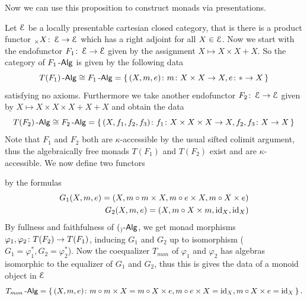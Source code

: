 \documentclass[a4paper,11pt,oneside,openany]{scrbook}
\begin{document}
Now we can use this proposition to construct monads via presentations.

\begin{exmp}
	Let $\operatorname{\mathcal{E}}$ be a locally presentable cartesian closed category, that is there is a product functor $_ \times X \colon \operatorname{\mathcal{E}} \to \operatorname{\mathcal{E}}$ which has a right adjoint for
	all $X \in \operatorname{\mathcal{E}}$. Now we start with the endofunctor $F_{1} \colon \operatorname{\mathcal{E}} \to \operatorname{\mathcal{E}}$ given by the assignment $X \mapsto X \times X + X$. So the category of
	$F_{1}\operatorname{-\mathsf{Alg}}$ is given by the following data
	\begin{equation*}
		T(F_{1})\operatorname{-\mathsf{Alg}} \cong F_{1}\operatorname{-\mathsf{Alg}} = \left\lbrace\,(X,m,e)\colon m\colon X \times X \to X,e \colon \ast \to X  \,\right\rbrace
	\end{equation*}
	satisfying no axioms. Furthermore we take another endofunctor $F_{2} \colon \operatorname{\mathcal{E}} \to \operatorname{\mathcal{E}}$ given by $X \mapsto X \times X \times X + X + X$ and obtain the data
	\begin{equation*}
		T(F_{2})\operatorname{-\mathsf{Alg}} \cong F_{2}\operatorname{-\mathsf{Alg}} = \left\lbrace\,(X,f_{1},f_{2},f_{3})\colon f_{1}\colon X \times X \times X \to X, f_{2},f_{3} \colon X \to X \,\right\rbrace
	\end{equation*}
	Note that $F_{1}$ and $F_{2}$ both are $\kappa$-accessible by the usual sifted colimit argument, thus the algebraically free monads $T(F_{1})$ and
	$T(F_{2})$ exist and are $\kappa$-accessible. We now define two functors
	\begin{center}
	\end{center}
	by the formulas
	\begin{align*}
		G_{1}(X,m,e) = (X, m \circ m \times X, m \circ e \times X, m \circ X \times e) \\
		G_{2}(X,m,e) = (X, m \circ X \times m, \operatorname{id}_{X}, \operatorname{id}_{X})
	\end{align*}
	By fullness and faithfulness of $(_)\operatorname{-\mathsf{Alg}}$, we get monad morphisms
    $\varphi_{1},\varphi_{2} \colon T(F_{2}) \to T(F_{1})$, inducing $G_{1}$ and
    $G_{2}$ up to isomorphism ($G_{1} = \varphi_{1}^{\ast},G_{2} =
    \varphi_{2}^{\ast}$). Now the coequalizer $T_{mon}$ of $\varphi_{1}$ and
    $\varphi_{2}$ has algebras isomorphic to the equalizer of $G_{1}$ and
    $G_{2}$, thus this is gives the data of a monoid object in $\operatorname{\mathcal{E}}$
	\begin{equation*}
		T_{mon}\operatorname{-\mathsf{Alg}} = \left\lbrace\,(X,m,e)\colon m \circ m \times X = m \circ X \times e, m
        \circ e \times X = \operatorname{id}_{X}, m \circ X \times e = \operatorname{id}_{X} \,\right\rbrace.
	\end{equation*}
\end{exmp}
\end{document}
